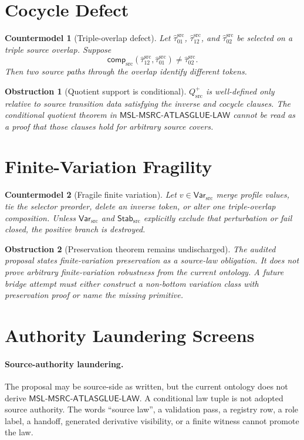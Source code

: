\documentclass[11pt]{article}
\newcommand{\MSL}{\mathsf{MSL}\mbox{-}\mathsf{MSRC}\mbox{-}\mathsf{ATLASGLUE}\mbox{-}\mathsf{LAW}}
\newcommand{\Tau}{\widehat{\tau}^{\mathrm{src}}}
\newcommand{\Var}{\mathsf{Var}_{\mathrm{src}}}
\newcommand{\Stab}{\mathsf{Stab}_{\mathrm{src}}}
\newcommand{\Qsrc}{Q_{\mathrm{src}}^{+}}
\newtheorem{countermodel}{Countermodel}
\newtheorem{obstruction}{Obstruction}
\begin{document}
\section{Cocycle Defect}

\begin{countermodel}[Triple-overlap defect]
Let \(\Tau_{01}\), \(\Tau_{12}\), and \(\Tau_{02}\) be selected on a triple
source overlap. Suppose
\[
  \mathsf{comp}_{\mathrm{src}}(\Tau_{12},\Tau_{01})\neq\Tau_{02}.
\]
Then two source paths through the overlap identify different tokens.
\end{countermodel}

\begin{obstruction}[Quotient support is conditional]
\(\Qsrc\) is well-defined only relative to source transition data satisfying
the inverse and cocycle clauses. The conditional quotient theorem in
\(\MSL\) cannot be read as a proof that those clauses hold for arbitrary
source covers.
\end{obstruction}

\section{Finite-Variation Fragility}

\begin{countermodel}[Fragile finite variation]
Let \(v\in\Var\) merge profile values, tie the selector preorder, delete an
inverse token, or alter one triple-overlap composition. Unless \(\Var\) and
\(\Stab\) explicitly exclude that perturbation or fail closed, the positive
branch is destroyed.
\end{countermodel}

\begin{obstruction}[Preservation theorem remains undischarged]
The audited proposal states finite-variation preservation as a source-law
obligation. It does not prove arbitrary finite-variation robustness from the
current ontology. A future bridge attempt must either construct a non-bottom
variation class with preservation proof or name the missing primitive.
\end{obstruction}

\section{Authority Laundering Screens}

\paragraph{Source-authority laundering.}
The proposal may be source-side as written, but the current ontology does not
derive \(\MSL\). A conditional law tuple is not adopted source authority. The
words ``source law'', a validation pass, a registry row, a role label, a
handoff, generated derivative visibility, or a finite witness cannot promote
the law.
\end{document}

